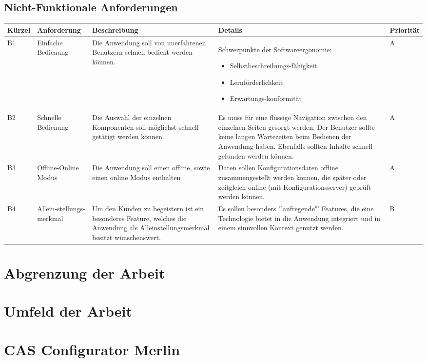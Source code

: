\subsection{Nicht-Funktionale Anforderungen}
\begin{tabular}{| p{1.1cm} | p{2.2cm} | p{4.3cm} | p{4.9cm} | p{1.3cm} |}
\toprule[2pt] \rowcolor{dunkelgrau}
\hline
  Kürzel & Anforderung & Beschreibung & Details & Priorität \\
  \hline
  B1 & Einfache \newline Bedienung & Die Anwendung soll von unerfahrenen Benutzern schnell bedient werden können.& Schwerpunkte der Softwareergonomie\cite{bib:softwareErgonomie}: 
  \begin{itemize}
        \item Selbstbeschreibungs-fähigkeit
        \item Lernförderlichkeit
        \item Erwartungs-konformität
     \end{itemize}
   & A \\
  \hline
  B2 & Schnelle Bedienung & Die Auswahl der einzelnen Komponenten soll möglichst schnell getätigt werden können. & Es muss für eine flüssige Navigation zwischen den einzelnen Seiten gesorgt werden. Der Benutzer sollte keine langen Wartezeiten beim Bedienen der Anwendung haben. Ebenfalls sollten Inhalte schnell gefunden werden können. & A \\
  \hline
    B3 & Offline-Online Modus & Die Anwendung soll einen offline, sowie einen online Modus enthalten & Daten sollen Konfigurationsdaten offline zusammengestellt werden können, die später oder zeitgleich online (mit Konfigurationsserver) geprüft werden können. & A \\
    \hline
    B4 & Allein-stellungs-merkmal & Um den Kunden zu begeistern ist ein besonderes Feature, welches die Anwendung als Alleinstellungsmerkmal besitzt wünschenswert.& Es sollen besonders "'aufregende"' Features, die eine Technologie bietet in die Anwendung integriert und in einem sinnvollen Kontext genutzt werden.  & B\\
    \hline
\bottomrule[2pt]
\end{tabular}

\section{Abgrenzung der Arbeit}

\section{Umfeld der Arbeit}

\section{CAS Configurator Merlin}
